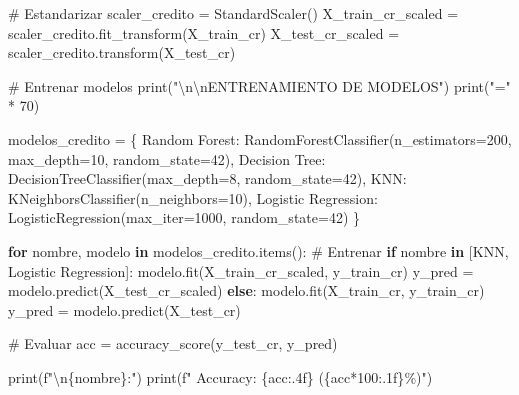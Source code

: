 \documentclass[
  doc,
  floatsintext,
  longtable,
  a4paper,
  nolmodern,
  notxfonts,
  notimes,
  12pt,
  colorlinks=true,linkcolor=blue,citecolor=blue,urlcolor=blue]{apa7}
\newenvironment{Shaded}{\begin{snugshade}}{\end{snugshade}}
\newcommand{\BuiltInTok}[1]{\textcolor[rgb]{0.00,0.23,0.31}{#1}}
\newcommand{\CharTok}[1]{\textcolor[rgb]{0.13,0.47,0.30}{#1}}
\newcommand{\CommentTok}[1]{\textcolor[rgb]{0.37,0.37,0.37}{#1}}
\newcommand{\ControlFlowTok}[1]{\textcolor[rgb]{0.00,0.23,0.31}{\textbf{#1}}}
\newcommand{\DecValTok}[1]{\textcolor[rgb]{0.68,0.00,0.00}{#1}}
\newcommand{\KeywordTok}[1]{\textcolor[rgb]{0.00,0.23,0.31}{\textbf{#1}}}
\newcommand{\NormalTok}[1]{\textcolor[rgb]{0.00,0.23,0.31}{#1}}
\newcommand{\OperatorTok}[1]{\textcolor[rgb]{0.37,0.37,0.37}{#1}}
\newcommand{\SpecialCharTok}[1]{\textcolor[rgb]{0.37,0.37,0.37}{#1}}
\newcommand{\SpecialStringTok}[1]{\textcolor[rgb]{0.13,0.47,0.30}{#1}}
\newcommand{\StringTok}[1]{\textcolor[rgb]{0.13,0.47,0.30}{#1}}
\begin{document}
\begin{Shaded}
\begin{Highlighting}[]
\CommentTok{\# Estandarizar}
\NormalTok{scaler\_credito }\OperatorTok{=}\NormalTok{ StandardScaler()}
\NormalTok{X\_train\_cr\_scaled }\OperatorTok{=}\NormalTok{ scaler\_credito.fit\_transform(X\_train\_cr)}
\NormalTok{X\_test\_cr\_scaled }\OperatorTok{=}\NormalTok{ scaler\_credito.transform(X\_test\_cr)}

\CommentTok{\# Entrenar modelos}
\BuiltInTok{print}\NormalTok{(}\StringTok{"}\CharTok{\textbackslash{}n\textbackslash{}n}\StringTok{ENTRENAMIENTO DE MODELOS"}\NormalTok{)}
\BuiltInTok{print}\NormalTok{(}\StringTok{"="} \OperatorTok{*} \DecValTok{70}\NormalTok{)}

\NormalTok{modelos\_credito }\OperatorTok{=}\NormalTok{ \{}
    \StringTok{\textquotesingle{}Random Forest\textquotesingle{}}\NormalTok{: RandomForestClassifier(n\_estimators}\OperatorTok{=}\DecValTok{200}\NormalTok{, max\_depth}\OperatorTok{=}\DecValTok{10}\NormalTok{, random\_state}\OperatorTok{=}\DecValTok{42}\NormalTok{),}
    \StringTok{\textquotesingle{}Decision Tree\textquotesingle{}}\NormalTok{: DecisionTreeClassifier(max\_depth}\OperatorTok{=}\DecValTok{8}\NormalTok{, random\_state}\OperatorTok{=}\DecValTok{42}\NormalTok{),}
    \StringTok{\textquotesingle{}KNN\textquotesingle{}}\NormalTok{: KNeighborsClassifier(n\_neighbors}\OperatorTok{=}\DecValTok{10}\NormalTok{),}
    \StringTok{\textquotesingle{}Logistic Regression\textquotesingle{}}\NormalTok{: LogisticRegression(max\_iter}\OperatorTok{=}\DecValTok{1000}\NormalTok{, random\_state}\OperatorTok{=}\DecValTok{42}\NormalTok{)}
\NormalTok{\}}

\ControlFlowTok{for}\NormalTok{ nombre, modelo }\KeywordTok{in}\NormalTok{ modelos\_credito.items():}
    \CommentTok{\# Entrenar}
    \ControlFlowTok{if}\NormalTok{ nombre }\KeywordTok{in}\NormalTok{ [}\StringTok{\textquotesingle{}KNN\textquotesingle{}}\NormalTok{, }\StringTok{\textquotesingle{}Logistic Regression\textquotesingle{}}\NormalTok{]:}
\NormalTok{        modelo.fit(X\_train\_cr\_scaled, y\_train\_cr)}
\NormalTok{        y\_pred }\OperatorTok{=}\NormalTok{ modelo.predict(X\_test\_cr\_scaled)}
    \ControlFlowTok{else}\NormalTok{:}
\NormalTok{        modelo.fit(X\_train\_cr, y\_train\_cr)}
\NormalTok{        y\_pred }\OperatorTok{=}\NormalTok{ modelo.predict(X\_test\_cr)}
    
    \CommentTok{\# Evaluar}
\NormalTok{    acc }\OperatorTok{=}\NormalTok{ accuracy\_score(y\_test\_cr, y\_pred)}
    
    \BuiltInTok{print}\NormalTok{(}\SpecialStringTok{f"}\CharTok{\textbackslash{}n}\SpecialCharTok{\{}\NormalTok{nombre}\SpecialCharTok{\}}\SpecialStringTok{:"}\NormalTok{)}
    \BuiltInTok{print}\NormalTok{(}\SpecialStringTok{f"  Accuracy: }\SpecialCharTok{\{}\NormalTok{acc}\SpecialCharTok{:.4f\}}\SpecialStringTok{ (}\SpecialCharTok{\{}\NormalTok{acc}\OperatorTok{*}\DecValTok{100}\SpecialCharTok{:.1f\}}\SpecialStringTok{\%)"}\NormalTok{)}
    

\end{Highlighting}
\end{Shaded}
\end{document}
